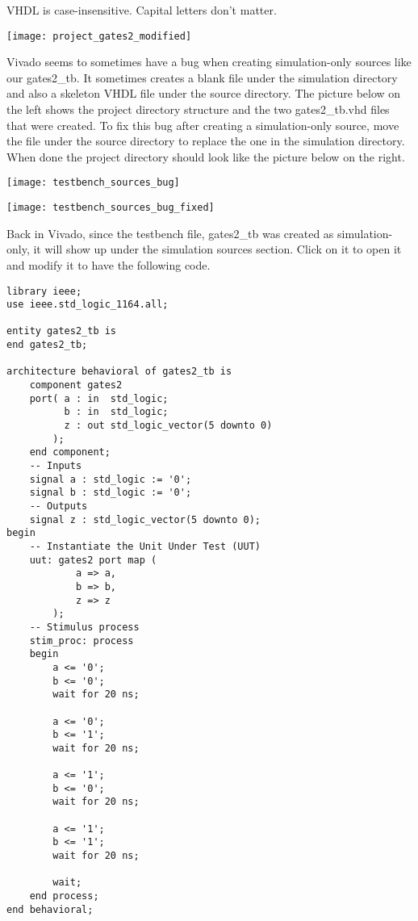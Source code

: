 \begin{mdframed}[style=note]
    VHDL is case-insensitive. Capital letters don't matter.
\end{mdframed}

\begin{center}
    \texttt{[image: project\_gates2\_modified]}
\end{center}

Vivado seems to sometimes have a bug when creating simulation-only sources like our gates2\_tb.
It sometimes creates a blank file under the simulation directory and also a skeleton VHDL file
under the source directory.
The picture below on the left shows the project directory structure and the two gates2\_tb.vhd
files that were created.
To fix this bug after creating a simulation-only source, move the file under the source directory
to replace the one in the simulation directory.
When done the project directory should look like the picture below on the right.

\vspace{3mm}
\noindent
\begin{minipage}[b]{0.45\textwidth}
    \centering
    \texttt{[image: testbench\_sources\_bug]}
\end{minipage}
\hfill
\begin{minipage}[b]{0.45\textwidth}
    \centering
    \texttt{[image: testbench\_sources\_bug\_fixed]}
\end{minipage}
\vspace{1mm}

Back in Vivado, since the testbench file, gates2\_tb was created as simulation-only,
it will show up under the simulation sources section.
Click on it to open it and modify it to have the following code.

\noindent
\begin{minipage}{\textwidth}
\begin{verbatim}
library ieee;
use ieee.std_logic_1164.all;

entity gates2_tb is
end gates2_tb;

architecture behavioral of gates2_tb is
    component gates2
    port( a : in  std_logic;
          b : in  std_logic;
          z : out std_logic_vector(5 downto 0)
        );
    end component;
    -- Inputs
    signal a : std_logic := '0';
    signal b : std_logic := '0';
    -- Outputs
    signal z : std_logic_vector(5 downto 0);
begin
    -- Instantiate the Unit Under Test (UUT)
    uut: gates2 port map (
            a => a,
            b => b,
            z => z
        );
    -- Stimulus process
    stim_proc: process
    begin
        a <= '0';
        b <= '0';
        wait for 20 ns;

        a <= '0';
        b <= '1';
        wait for 20 ns;

        a <= '1';
        b <= '0';
        wait for 20 ns;

        a <= '1';
        b <= '1';
        wait for 20 ns;

        wait;
    end process;
end behavioral;
\end{verbatim}
\end{minipage}
\strut

